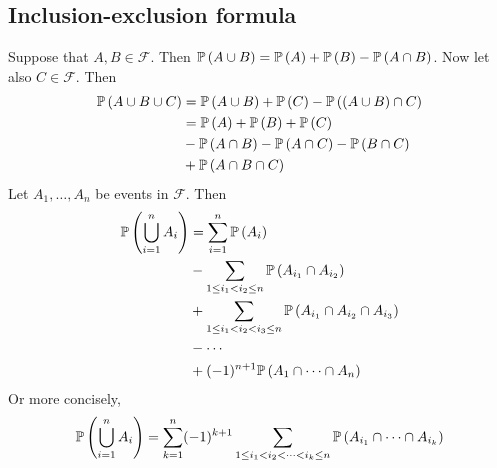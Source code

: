 \subsection{Inclusion-exclusion formula}
Suppose that \(A, B \in \mathcal F\).
Then \(\mathbb{P}\left({A \cup B}\right) = \mathbb{P}\left({A}\right) + \mathbb{P}\left({B}\right) - \mathbb{P}\left({A \cap B}\right)\).
Now let also \(C \in \mathcal F\).
Then
\begin{align*}
	\mathbb{P}\left({A \cup B \cup C}\right) & = \mathbb{P}\left({A \cup B}\right) + \mathbb{P}\left({C}\right) - \mathbb{P}\left({(A \cup B) \cap C}\right) \\
	                       & = \mathbb{P}\left({A}\right) + \mathbb{P}\left({B}\right) + \mathbb{P}\left({C}\right)                        \\
	                       & - \mathbb{P}\left({A \cap B}\right) - \mathbb{P}\left({A \cap C}\right) - \mathbb{P}\left({B \cap C}\right)   \\
	                       & + \mathbb{P}\left({A \cap B \cap C}\right)
\end{align*}
Let \(A_1, \dots, A_n\) be events in \(\mathcal F\).
Then
\begin{align*}
	\mathbb{P}\left({\bigcup_{i=1}^n A_i}\right) & = \sum_{i=1}^n \mathbb{P}\left({A_i}\right)                                                      \\
	                           & - \sum_{1 \leq i_1 < i_2 \leq n}\mathbb{P}\left({A_{i_1} \cap A_{i_2}}\right)                    \\
	                           & + \sum_{1 \leq i_1 < i_2 < i_3 \leq n}\mathbb{P}\left({A_{i_1} \cap A_{i_2} \cap A_{i_3}}\right) \\
	                           & - \cdots                                                                       \\
	                           & + (-1)^{n+1}\mathbb{P}\left({A_1 \cap \dots \cap A_n}\right)
\end{align*}
Or more concisely,
\[
	\mathbb{P}\left({\bigcup_{i=1}^n A_i}\right) = \sum_{k=1}^n (-1)^{k+1} \sum_{1 \leq i_1 < i_2 < \dots < i_k \leq n} \mathbb{P}\left({A_{i_1} \cap \dots \cap A_{i_k}}\right)
\]

